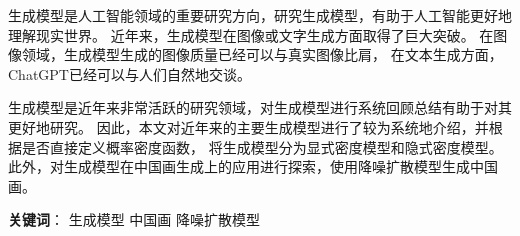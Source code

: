 \newpage
\begin{center}
    \fontsize{18}{1}
\end{center}
\begin{tcolorbox}
\begin{center}
    \fontsize{16}{0}
\end{center}
\vspace{8mm}
\noindent
{\fontsize{16}{0}}
\vspace{2mm}

\setlength{\parindent}{24pt}
生成模型是人工智能领域的重要研究方向，研究生成模型，有助于人工智能更好地理解现实世界。
近年来，生成模型在图像或文字生成方面取得了巨大突破。
在图像领域，生成模型生成的图像质量已经可以与真实图像比肩，
在文本生成方面，ChatGPT已经可以与人们自然地交谈。

生成模型是近年来非常活跃的研究领域，对生成模型进行系统回顾总结有助于对其更好地研究。
因此，本文对近年来的主要生成模型进行了较为系统地介绍，并根据是否直接定义概率密度函数，
将生成模型分为显式密度模型和隐式密度模型。
此外，对生成模型在中国画生成上的应用进行探索，使用降噪扩散模型生成中国画。
\vspace{8mm}

\noindent\textbf{关键词}： \quad 生成模型 \quad 中国画 \quad 降噪扩散模型
\end{tcolorbox}


